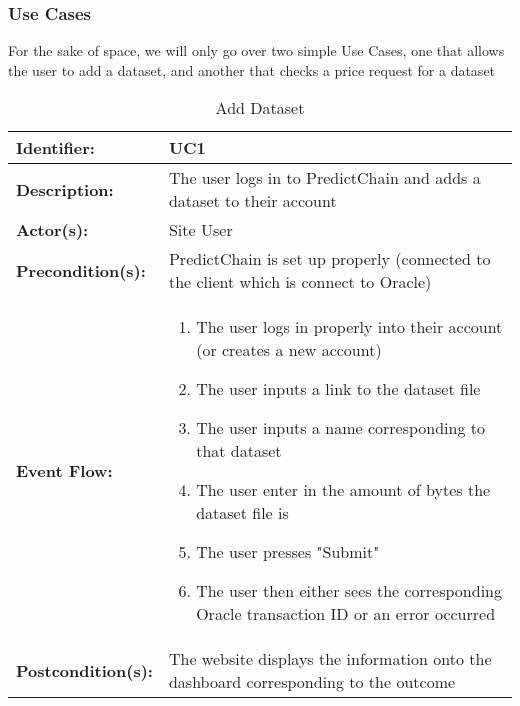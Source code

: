 \documentclass{article}
\begin{document}
    \subsubsection*{Use Cases}
    For the sake of space, we will only go over two simple Use Cases, one that allows the user to add a dataset, and
    another that checks a price request for a dataset

    \begin{table}[H]
        \caption{Add Dataset}
        \label{tab:add-ds}
        \centering
        \begin{tabular}{|p{3cm}|p{8cm}|}
            \hline
            \textbf{Identifier:} & UC1 \\
            \hline
            \textbf{Description:} & The user logs in to PredictChain and adds a dataset to their account\\
            \hline
            \textbf{Actor(s):} & Site User \\
            \hline
            \textbf{Precondition(s):} & PredictChain is set up properly (connected to the client which is connect to Oracle) \\
            \hline
            \textbf{Event Flow:} &
            \begin{enumerate}
                \item The user logs in properly into their account (or creates a new account)
                \item The user inputs a link to the dataset file
                \item The user inputs a name corresponding to that dataset
                \item The user enter in the amount of bytes the dataset file is
                \item The user presses "Submit"
                \item The user then either sees the corresponding Oracle transaction ID or an error occurred
            \end{enumerate} \\
            \hline
            \textbf{Postcondition(s):} & The website displays the information onto the dashboard corresponding to the outcome \\
            \hline
        \end{tabular}
    \end{table}
\end{document}
